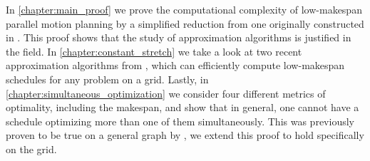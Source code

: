 In \cref{chapter:main_proof} we prove the computational complexity of low-makespan parallel motion planning by a simplified reduction from one originally constructed in \cite{siamcomp/DemaineFKMS19}.
This proof shows that the study of approximation algorithms is justified in the field.
In \cref{chapter:constant_stretch} we take a look at two recent approximation algorithms from \cite{siamcomp/DemaineFKMS19}, which can efficiently compute low-makespan schedules for any problem on a grid.
Lastly, in \cref{chapter:simultaneous_optimization} we consider four different metrics of optimality, including the makespan, and show that in general, one cannot have a schedule optimizing more than one of them simultaneously.
This was previously proven to be true on a general graph by \cite{corr/YuL15c}, we extend this proof to hold specifically on the grid.
